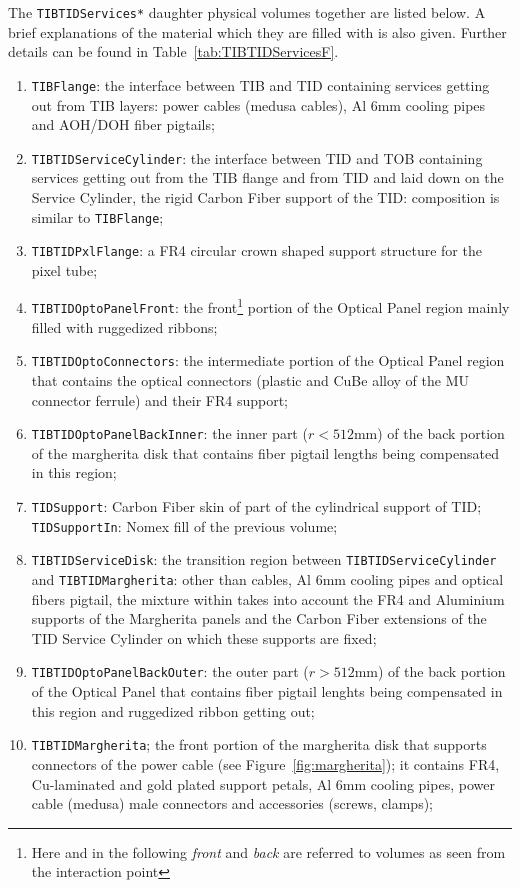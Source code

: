 The {\tt TIBTIDServices*} daughter physical volumes together are listed below. A brief explanations of the material  which they are filled with is also given. Further details can be found in Table~\ref{tab:TIBTIDServicesF}. 

\begin{enumerate}
\item {\tt TIBFlange}: the interface between TIB and TID containing services getting out from TIB layers: power cables (medusa cables), Al 6mm cooling pipes and AOH/DOH fiber pigtails;
\item {\tt  TIBTIDServiceCylinder}: the interface between TID and TOB
  containing services getting out from the TIB flange and from TID and laid down on the Service Cylinder, the rigid Carbon Fiber support of the TID: composition is similar to {\tt TIBFlange};
\item {\tt TIBTIDPxlFlange}: a FR4 circular crown shaped support structure for the pixel tube;
\item {\tt TIBTIDOptoPanelFront}: the front\footnote{Here and in the following {\em front} and {\em back} are referred to volumes as seen from the interaction point} portion of the Optical Panel region mainly filled with ruggedized ribbons;
\item {\tt TIBTIDOptoConnectors}: the intermediate portion of the Optical Panel region that contains the optical connectors (plastic and CuBe alloy of the MU connector ferrule) and their FR4 support;
\item {\tt TIBTIDOptoPanelBackInner}: the inner part ($r<512$mm) of the back portion of the margherita disk that contains fiber pigtail lengths being compensated in this region;
\item {\tt TIDSupport}: Carbon Fiber skin of part of the cylindrical support of TID; {\tt TIDSupportIn}:  Nomex  fill of the previous volume;
\item {\tt TIBTIDServiceDisk}: the transition region between {\tt TIBTIDServiceCylinder} and {\tt TIBTIDMargherita}: other than cables, Al 6mm cooling pipes and optical fibers pigtail, the mixture within takes into account the FR4 and Aluminium supports of the Margherita panels and the Carbon Fiber extensions of the TID Service Cylinder on which these supports are fixed; 
\item{\tt  TIBTIDOptoPanelBackOuter}: the outer part ($r>512$mm) of the back portion  of the Optical Panel that contains fiber pigtail lenghts being compensated in this region and ruggedized ribbon getting out;
\item{\tt  TIBTIDMargherita}; the front portion of the margherita disk that supports connectors of the power cable (see Figure~\ref{fig:margherita}); it contains FR4, Cu-laminated and gold plated support petals, Al 6mm cooling pipes, power cable (medusa) male connectors and accessories (screws, clamps);   

\end{enumerate}
